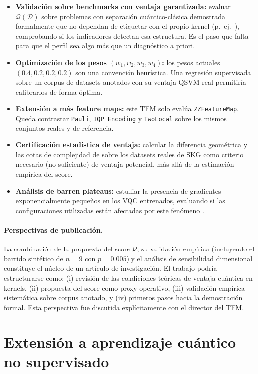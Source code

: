 \begin{itemize}
    \item \textbf{Validación sobre benchmarks con ventaja garantizada:} evaluar $\mathcal{Q}(\mathcal{D})$ sobre problemas con separación cuántico-clásica demostrada formalmente que no dependan de etiquetar con el propio kernel (p.~ej.\ \citealp{liu2021}), comprobando si los indicadores detectan esa estructura. Es el paso que falta para que el perfil sea algo más que un diagnóstico a priori.
    \item \textbf{Optimización de los pesos $(w_1, w_2, w_3, w_4)$:} los pesos actuales $(0.4, 0.2, 0.2, 0.2)$ son una convención heurística. Una regresión supervisada sobre un corpus de datasets anotados con su ventaja QSVM real permitiría calibrarlos de forma óptima.
    \item \textbf{Extensión a más feature maps:} este TFM solo evalúa \texttt{ZZFeatureMap}. Queda contrastar \texttt{Pauli}, \texttt{IQP Encoding} y \texttt{TwoLocal} sobre los mismos conjuntos reales y de referencia.
    \item \textbf{Certificación estadística de ventaja:} calcular la diferencia geométrica y las cotas de complejidad de \cite{huang2021} sobre los datasets reales de SKG como criterio necesario (no suficiente) de ventaja potencial, más allá de la estimación empírica del score.
    \item \textbf{Análisis de barren plateaus:} estudiar la presencia de gradientes exponencialmente pequeños en los VQC entrenados, evaluando si las configuraciones utilizadas están afectadas por este fenómeno \citep{cerezo2023}.
\end{itemize}

\paragraph{Perspectivas de publicación.}
La combinación de la propuesta del score $\mathcal{Q}$, su validación empírica (incluyendo el barrido sintético de $n=9$ con $p=0.005$) y el análisis de sensibilidad dimensional constituye el núcleo de un artículo de investigación. El trabajo podría estructurarse como: (i) revisión de las condiciones teóricas de ventaja cuántica en kernels, (ii) propuesta del score como proxy operativo, (iii) validación empírica sistemática sobre corpus anotado, y (iv) primeros pasos hacia la demostración formal. Esta perspectiva fue discutida explícitamente con el director del TFM.

\section{Extensión a aprendizaje cuántico no supervisado}
\label{sec:futuro_no_supervisado}

